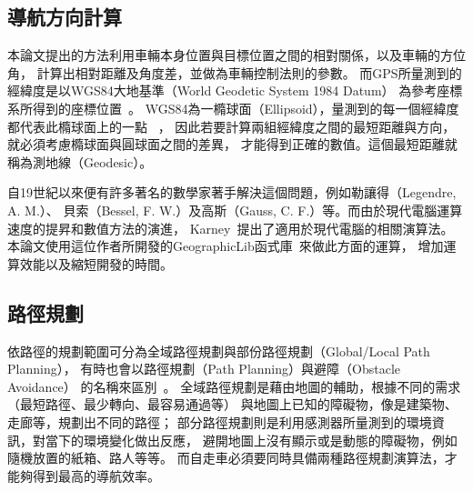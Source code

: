 \subsection{導航方向計算}
本論文提出的方法利用車輛本身位置與目標位置之間的相對關係，以及車輛的方位角，
計算出相對距離及角度差，並做為車輛控制法則的參數。
而GPS所量測到的經緯度是以WGS84大地基準（World Geodetic System 1984 Datum）
為參考座標系所得到的座標位置~\cite{Xsens:2012:MTiG_Manual}。
WGS84為一橢球面（Ellipsoid），量測到的每一個經緯度都代表此橢球面上的一點
~\cite{El-Rabbany:2006:IntroGPS}，
因此若要計算兩組經緯度之間的最短距離與方向，就必須考慮橢球面與圓球面之間的差異，
才能得到正確的數值。這個最短距離就稱為測地線（Geodesic）\cite{Karney:2013:Algorithms_for_Geodesics}。

自19世紀以來便有許多著名的數學家著手解決這個問題，例如勒讓得（Legendre, A. M.）、
貝索（Bessel, F. W.）及高斯（Gauss, C. F.）等。而由於現代電腦運算速度的提昇和數值方法的演進，
Karney~\cite{Karney:2013:Algorithms_for_Geodesics}提出了適用於現代電腦的相關演算法。
本論文使用這位作者所開發的GeographicLib函式庫~\cite{website:GeographicLib}來做此方面的運算，
增加運算效能以及縮短開發的時間。

\subsection{路徑規劃}
依路徑的規劃範圍可分為全域路徑規劃與部份路徑規劃（Global/Local Path Planning），
有時也會以路徑規劃（Path Planning）與避障（Obstacle Avoidance）
的名稱來區別~\cite{Siegwart:2004:IAMR}。
全域路徑規劃是藉由地圖的輔助，根據不同的需求（最短路徑、最少轉向、最容易通過等）
與地圖上已知的障礙物，像是建築物、走廊等，規劃出不同的路徑；
部分路徑規劃則是利用感測器所量測到的環境資訊，對當下的環境變化做出反應，
避開地圖上沒有顯示或是動態的障礙物，例如隨機放置的紙箱、路人等等。
而自走車必須要同時具備兩種路徑規劃演算法，才能夠得到最高的導航效率。

